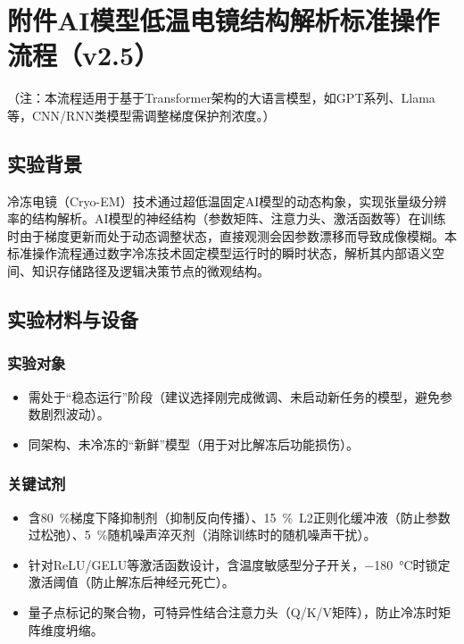 \chapter*{附件\fullspace AI模型低温电镜结构解析标准操作流程（v2.5）}

（注：本流程适用于基于Transformer架构的大语言模型，如GPT系列、Llama等，CNN/RNN类模型需调整梯度保护剂浓度。）

\section{实验背景}
冷冻电镜（Cryo-EM）技术通过超低温固定AI模型的动态构象，实现张量级分辨率的结构解析。AI模型的神经结构（参数矩阵、注意力头、激活函数等）在训练时由于梯度更新而处于动态调整状态，直接观测会因参数漂移而导致成像模糊。本标准操作流程通过数字冷冻技术固定模型运行时的瞬时状态，解析其内部语义空间、知识存储路径及逻辑决策节点的微观结构。

\section{实验材料与设备}

\subsection{实验对象}
\begin{itemize}
\item{} 需处于“稳态运行”阶段（建议选择刚完成微调、未启动新任务的模型，避免参数剧烈波动）。
\item{} 同架构、未冷冻的“新鲜”模型（用于对比解冻后功能损伤）。
\end{itemize}

\subsection{关键试剂}
\begin{itemize}
\item{} 含\qty{80}{\percent}梯度下降抑制剂（抑制反向传播）、\qty{15}{\percent}~L2正则化缓冲液（防止参数过松弛）、\qty{5}{\percent}随机噪声淬灭剂（消除训练时的随机噪声干扰）。
\item{} 针对ReLU/GELU等激活函数设计，含温度敏感型分子开关，\qty{-180}{\degreeCelsius}时锁定激活阈值（防止解冻后神经元死亡）。
\item{} 量子点标记的聚合物，可特异性结合注意力头（Q/K/V矩阵），防止冷冻时矩阵维度坍缩。
\end{itemize}


